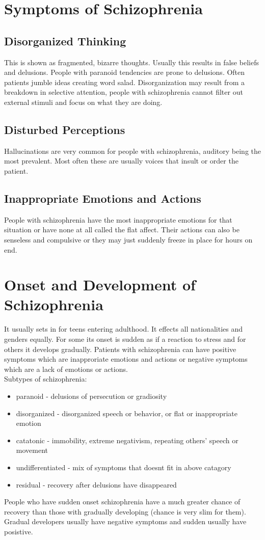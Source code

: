 \documentclass[12pt]{article}
\begin{document}
\section*{Symptoms of Schizophrenia}
\subsection*{Disorganized Thinking}
This is shown as fragmented, bizarre thoughts. Usually this results in false beliefs and delusions. People with paranoid tendencies are prone to delusions. Often patients jumble ideas creating word salad. Disorganization may result from a breakdown in selective attention, people with schizophrenia cannot filter out external stimuli and focus on what they are doing. 
\subsection*{Disturbed Perceptions}
Hallucinations are very common for people with schizophrenia, auditory being the most prevalent. Most often these are usually voices that insult or order the patient. 
\subsection*{Inappropriate Emotions and Actions}
People with schizophrenia have the most inappropriate emotions for that situation or have none at all called the flat affect. Their actions can also be senseless and compulsive or they may just suddenly freeze in place for hours on end. 
\section*{Onset and Development of Schizophrenia}
It usually sets in for teens entering adulthood. It effects all nationalities and genders equally. For some its onset is sudden as if a reaction to stress and for others it develops gradually. Patients with schizophrenia can have positive symptoms which are inapproriate emotions and actions or negative symptoms which are a lack of emotions or actions. \\
Subtypes of schizophrenia:
\begin{itemize}
\item paranoid - delusions of persecution or gradiosity
\item disorganized - disorganized speech or behavior, or flat or inappropriate emotion
\item catatonic - immobility, extreme negativism, repeating others' speech or movement
\item undifferentiated - mix of symptoms that doesnt fit in above catagory
\item residual - recovery after delusions have disappeared
\end{itemize}
People who have sudden onset schizophrenia have a much greater chance of recovery than those with gradually developing (chance is very slim for them). Gradual developers usually have negative symptoms and sudden usually have posistive.
\end{document}

